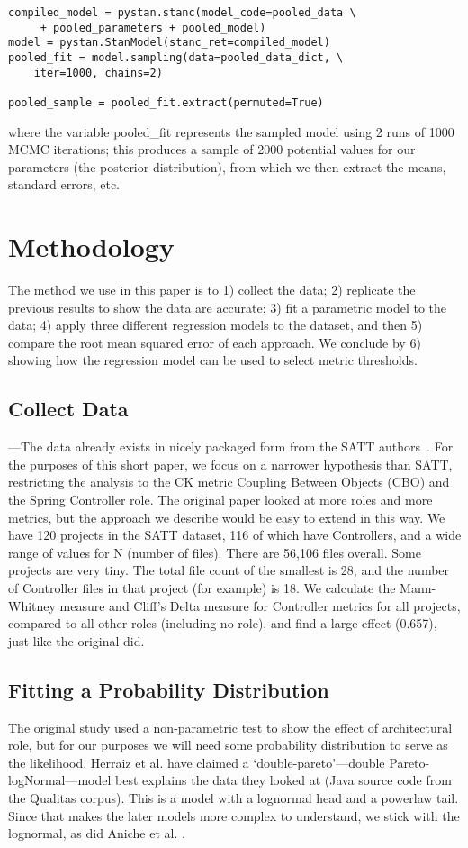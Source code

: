 \documentclass[sigconf,natbib=false]{acmart}
\begin{document}
\begin{verbatim}
compiled_model = pystan.stanc(model_code=pooled_data \
	 + pooled_parameters + pooled_model)
model = pystan.StanModel(stanc_ret=compiled_model)
pooled_fit = model.sampling(data=pooled_data_dict, \
	iter=1000, chains=2)

pooled_sample = pooled_fit.extract(permuted=True)
\end{verbatim}

where the variable \textsf{pooled\_fit} represents the sampled model using 2 runs of 1000 MCMC iterations; this produces a sample of 2000 potential values for our parameters (the posterior distribution), from which we then extract the means, standard errors, etc.

\section{Methodology}
The method we use in this paper is to 1) collect the data; 2) replicate the previous results to show the data are accurate; 3) fit a parametric model to the data; 4) apply three different regression models to the dataset, and then 5) compare the root mean squared error of each approach. We conclude by 6) showing how the regression model can be used to select metric thresholds.

\subsection{Collect Data}---The data already exists in nicely packaged form from the SATT authors~\cite{aniche16}. For the purposes of this short paper, we focus on a narrower hypothesis than SATT, restricting the analysis to the CK metric Coupling Between Objects (CBO) and the Spring Controller role. The original paper looked at more roles and more metrics, but the approach we describe would be easy to extend in this way. We have 120 projects in the SATT  dataset, 116 of which have Controllers, and a wide range of values for N (number of files). There are 56,106 files overall. Some projects are very tiny. The total file count of the smallest is 28, and the number of Controller files in that project (for example) is 18. We calculate the Mann-Whitney measure and Cliff's Delta measure for Controller metrics for all projects, compared to all other roles (including no role), and find a large effect (0.657), just like the original did. 

\subsection{Fitting a Probability Distribution}
The original study used a non-parametric test to show the effect of architectural role, but for our purposes we will need some probability distribution to serve as the likelihood. Herraiz et al. \cite{Herraiz2012} have claimed a `double-pareto'---double Pareto-logNormal---model best explains the data they looked at (Java source code from the Qualitas corpus). This is a model with a lognormal head and a powerlaw tail. Since that makes the later models more complex to understand, we stick with the lognormal, as did Aniche et al. \cite{Aniche2016}.
\end{document}

